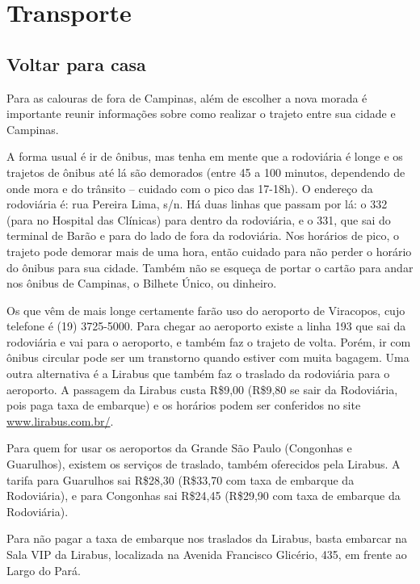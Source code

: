 
\section{Transporte}
\subsection{Voltar para casa}

Para as calouras de fora de Campinas, além de escolher a nova morada é
importante reunir informações sobre como realizar o trajeto entre sua cidade e
Campinas.

A forma usual é ir de ônibus, mas tenha em mente que a rodoviária é longe e os
trajetos de ônibus até lá são demorados (entre 45 a 100 minutos, dependendo de
onde mora e do trânsito -- cuidado com o pico das 17-18h). O endereço da
rodoviária é: rua Pereira Lima, s/n. Há duas linhas que passam por lá: o 332
(para no Hospital das Clínicas) para dentro da rodoviária, e o 331, que sai do
terminal de Barão e para do lado de fora da rodoviária. Nos horários de pico, o
trajeto pode demorar mais de uma hora, então cuidado para não perder o horário
do ônibus para sua cidade. Também não se esqueça de portar o cartão para andar
nos ônibus de Campinas, o Bilhete Único, ou dinheiro.

Os que vêm de mais longe certamente farão uso do aeroporto de Viracopos, cujo
telefone é (19) 3725-5000. Para chegar ao aeroporto existe a linha 193 que sai
da rodoviária e vai para o aeroporto, e também faz o trajeto de volta. Porém,
ir com ônibus circular pode ser um transtorno quando estiver com muita bagagem.
Uma outra alternativa é a Lirabus que também faz o traslado da rodoviária para
o aeroporto. A passagem da Lirabus custa R\$9,00 (R\$9,80 se sair da
Rodoviária, pois paga taxa de embarque) e os horários podem ser conferidos no
site \url{www.lirabus.com.br/}.

Para quem for usar os aeroportos da Grande São Paulo (Congonhas e Guarulhos),
existem os serviços de traslado, também oferecidos pela Lirabus. A tarifa para
Guarulhos sai R\$28,30 (R\$33,70 com taxa de embarque da Rodoviária), e para
Congonhas sai R\$24,45 (R\$29,90 com taxa de embarque da Rodoviária).

Para não pagar a taxa de embarque nos traslados da Lirabus, basta embarcar na
Sala VIP da Lirabus, localizada na Avenida Francisco Glicério, 435, em frente
ao Largo do Pará.

